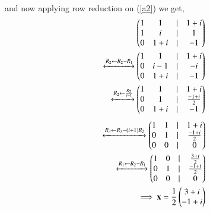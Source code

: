 \documentclass[journal,12pt,twocolumn]{IEEEtran}
\begin{document}
\begin{enumerate}[label=\emph{\alph*)}]
\begin{align}
\end{align}
and now applying row reduction on (\ref{a2}) we get,
\begin{align}
        \begin{pmatrix}1 & 1 & | & 1+i \\
	       1 & i & | & 1 \\
               0 & 1+i &| & -1\end{pmatrix}\\
        \xleftrightarrow[]{R_2 \leftarrow R_2-R_1}
        \begin{pmatrix}1 & 1 & | & 1+i \\
               0 & i-1 & | & -i \\
               0 & 1+i &| & -1\end{pmatrix}\\
        \xleftrightarrow[]{R_2 \leftarrow \frac{R_2}{i-1}}
        \begin{pmatrix}1 & 1 & | & 1+i \\
               0 & 1 & | & \frac{-1+i}{2} \\
               0 & 1+i &| & -1\end{pmatrix}
\end{align}
\begin{align}
        \xleftrightarrow[]{R_3 \leftarrow R_3 - (i+1)R_2}
        \begin{pmatrix}1 & 1 & | & 1+i \\
               0 & 1 & | & \frac{-1+i}{2} \\
               0 & 0 &| & 0\end{pmatrix}\\
        \xleftrightarrow[]{R_1 \leftarrow R_2-R_1}
        \begin{pmatrix}1 & 0 & | & \frac{3+i}{2} \\
               0 & 1 & | & \frac{-1+i}{2} \\
               0 & 0 &| & 0\end{pmatrix}\\
        \implies
        \mathbf{x}=\frac{1}{2}\begin{pmatrix}3+i \\ -1+i\end{pmatrix}
\end{align}
\end{enumerate}
\end{document}
